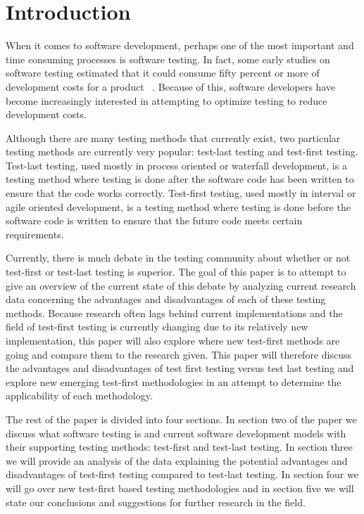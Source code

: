 \documentclass{sig-alternate}
\begin{document}


\section{Introduction}
When it comes to software development, perhaps one of the most important and time consuming processes is software testing.  In fact, some early studies on software testing estimated that it could consume fifty percent or more of development costs for a product ~\cite{Bertolino:2007}.  Because of this, software developers have become increasingly interested in attempting to optimize testing to reduce development costs.

Although there are many testing methods that currently exist, two particular testing methods are currently very popular: test-last testing and test-first testing.  Test-last testing, used mostly in process oriented or waterfall development, is a testing method where testing is done after the software code has been written to ensure that the code works correctly.  Test-first testing, used mostly in interval or agile oriented development, is a testing method where testing is done before the software code is written to ensure that the future code meets certain requirements.

Currently, there is much debate in the testing community about whether or not test-first or test-last testing is superior.  The goal of this paper is to attempt to give an overview of the current state of this debate by analyzing current research data concerning the advantages and disadvantages of each of these testing methods.  Because research often lags behind current implementations and the field of test-first testing is currently changing due to its relatively new implementation, this paper will also explore where new test-first methods are going and compare them to the research given.  This paper will therefore discuss the advantages and disadvantages of test first testing versus test last testing and explore new emerging test-first methodologies in an attempt to determine the applicability of each methodology.

The rest of the paper is divided into four sections.  In section two of the paper we discuss what software testing is and current software development models with their supporting testing methods: test-first and test-last testing.  In section three we will provide an analysis of the data explaining the potential advantages and disadvantages of test-first testing compared to test-last testing.  In section four we will go over new test-first based testing methodologies and in section five we will state our conclusions and suggestions for further research in the field.
\end{document}
